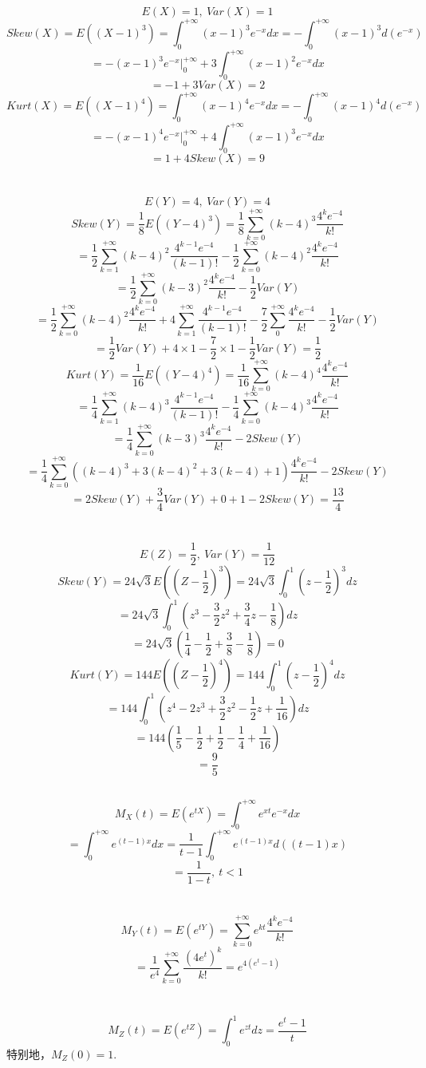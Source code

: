 \documentclass{article}
\begin{document}
\begin{CJK}{UTF8}{gbsn}
\subsection{}
$$ E(X)=1,\ Var(X)=1 $$
$$ Skew(X)=E((X-1)^{3})=\int_{0}^{+\infty}(x-1)^{3}e^{-x}dx=-\int_{0}^{+\infty}(x-1)^{3}d(e^{-x})$$
$$ =-(x-1)^{3}e^{-x}|_{0}^{+\infty}+3\int_{0}^{+\infty}(x-1)^{2}e^{-x}dx $$
$$ =-1+3Var(X)=2$$
$$ Kurt(X)=E((X-1)^{4})=\int_{0}^{+\infty}(x-1)^{4}e^{-x}dx=-\int_{0}^{+\infty}(x-1)^{4}d(e^{-x})$$
$$ =-(x-1)^{4}e^{-x}|_{0}^{+\infty}+4\int_{0}^{+\infty}(x-1)^{3}e^{-x}dx$$
$$ =1+4Skew(X)=9$$
\\\\
$$ E(Y)=4,\ Var(Y)=4 $$
$$ Skew(Y)=\frac{1}{8}E((Y-4)^{3})=\frac{1}{8}\sum\limits_{k=0}^{+\infty}(k-4)^{3}\frac{4^{k}e^{-4}}{k!}$$
$$ =\frac{1}{2}\sum\limits_{k=1}^{+\infty}(k-4)^{2}\frac{4^{k-1}e^{-4}}{(k-1)!}-\frac{1}{2}\sum\limits_{k=0}^{+\infty}(k-4)^{2}\frac{4^{k}e^{-4}}{k!}$$
$$ =\frac{1}{2}\sum\limits_{k=0}^{+\infty}(k-3)^{2}\frac{4^{k}e^{-4}}{k!}-\frac{1}{2}Var(Y)$$
$$ =\frac{1}{2}\sum\limits_{k=0}^{+\infty}(k-4)^{2}\frac{4^{k}e^{-4}}{k!}+4\sum\limits_{k=1}^{+\infty}\frac{4^{k-1}e^{-4}}{(k-1)!}-\frac{7}{2}\sum\limits_{0}^{+\infty}\frac{4^{k}e^{-4}}{k!}-\frac{1}{2}Var(Y)$$
$$ =\frac{1}{2}Var(Y)+4\times 1-\frac{7}{2}\times 1-\frac{1}{2}Var(Y)=\frac{1}{2}$$
$$ Kurt(Y)=\frac{1}{16}E((Y-4)^{4})=\frac{1}{16}\sum\limits_{k=0}^{+\infty}(k-4)^{4}\frac{4^{k}e^{-4}}{k!}$$
$$ =\frac{1}{4}\sum\limits_{k=1}^{+\infty}(k-4)^{3}\frac{4^{k-1}e^{-4}}{(k-1)!}-\frac{1}{4}\sum\limits_{k=0}^{+\infty}(k-4)^{3}\frac{4^{k}e^{-4}}{k!}$$
$$ =\frac{1}{4}\sum\limits_{k=0}^{+\infty}(k-3)^{3}\frac{4^{k}e^{-4}}{k!}-2Skew(Y)$$
$$ =\frac{1}{4}\sum\limits_{k=0}^{+\infty}((k-4)^{3}+3(k-4)^{2}+3(k-4)+1)\frac{4^{k}e^{-4}}{k!}-2Skew(Y)$$
$$ =2Skew(Y)+\frac{3}{4}Var(Y)+0+1-2Skew(Y)=\frac{13}{4}$$
\\\\
$$ E(Z)=\frac{1}{2},\ Var(Y)=\frac{1}{12} $$
$$ Skew(Y)=24\sqrt{3}E((Z-\frac{1}{2})^{3})=24\sqrt{3}\int_{0}^{1}(z-\frac{1}{2})^{3}dz$$
$$ =24\sqrt{3}\int_{0}^{1}(z^{3}-\frac{3}{2}z^{2}+\frac{3}{4}z-\frac{1}{8})dz$$
$$ =24\sqrt{3}(\frac{1}{4}-\frac{1}{2}+\frac{3}{8}-\frac{1}{8})=0$$
$$ Kurt(Y)=144E((Z-\frac{1}{2})^{4})=144\int_{0}^{1}(z-\frac{1}{2})^{4}dz$$
$$ =144\int_{0}^{1}(z^{4}-2z^{3}+\frac{3}{2}z^{2}-\frac{1}{2}z+\frac{1}{16})dz$$
$$ =144(\frac{1}{5}-\frac{1}{2}+\frac{1}{2}-\frac{1}{4}+\frac{1}{16})$$
$$ =\frac{9}{5}$$
\subsection{}
$$ M_{X}(t)=E(e^{tX})=\int_{0}^{+\infty}e^{xt}e^{-x}dx$$
$$ =\int_{0}^{+\infty}e^{(t-1)x}dx=\frac{1}{t-1}\int_{0}^{+\infty}e^{(t-1)x}d((t-1)x)$$
$$ =\frac{1}{1-t},\ t<1$$
\\\\
$$ M_{Y}(t)=E(e^{tY})=\sum\limits_{k=0}^{+\infty}e^{kt}\frac{4^{k}e^{-4}}{k!}$$
$$ =\frac{1}{e^{4}}\sum\limits_{k=0}^{+\infty}\frac{(4e^{t})^{k}}{k!}=e^{4(e^{t}-1)}$$
\\\\
$$ M_{Z}(t)=E(e^{tZ})=\int_{0}^{1}e^{zt}dz=\frac{e^{t}-1}{t}$$
特别地，$M_{Z}(0)=1$.

\end{CJK}
\end{document}
